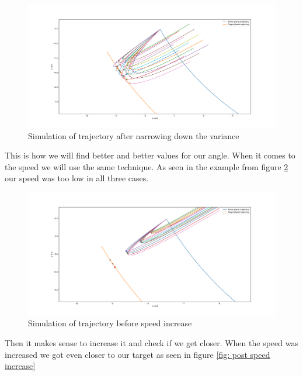 \documentclass[reprint,english,notitlepage]{revtex4-2}
\begin{document}
\begin{figure}[h!]
  \centering
  \includegraphics[scale = .125]{Figures/narrowing_down_angle.pdf}
  \caption{Simulation of trajectory after narrowing down the variance}
  \label{fig: simulation tighter}
\end{figure}

This is how we will find better and better values for our angle. When it comes to the speed we will use the same technique. As seen in the example from figure \ref{fig: pre speed increase} our speed was too low in all three cases. 

\begin{figure}[h!]
  \centering
  \includegraphics[scale = .125]{Figures/pre_speed_increase.pdf}
  \caption{Simulation of trajectory before speed increase}
  \label{fig: pre speed increase}
\end{figure}

Then it makes sense to increase it and check if we get closer. When the speed was increased we got even closer to our target as seen in figure \ref{fig: post speed increase}
\end{document}

